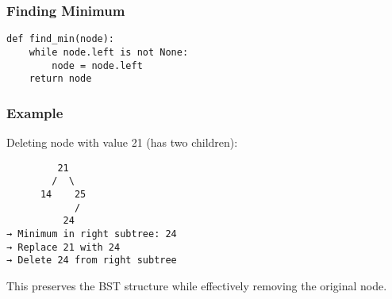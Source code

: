 \subsubsection*{Finding Minimum}
\begin{verbatim}
def find_min(node):
    while node.left is not None:
        node = node.left
    return node
\end{verbatim}

\subsubsection*{Example}
Deleting node with value 21 (has two children):

\begin{verbatim}
         21
        /  \
      14    25
            /
          24
→ Minimum in right subtree: 24
→ Replace 21 with 24
→ Delete 24 from right subtree
\end{verbatim}

This preserves the BST structure while effectively removing the original node.
